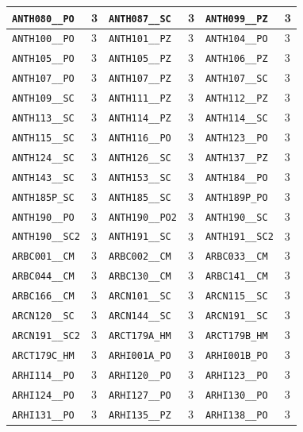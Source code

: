 \begin{longtable}{|l|l||l|l||l|l|}
    \verb|ANTH080__PO| & 3 & \verb|ANTH087__SC| & 3 & \verb|ANTH099__PZ| & 3\\\hline
    \verb|ANTH100__PO| & 3 & \verb|ANTH101__PZ| & 3 & \verb|ANTH104__PO| & 3\\\hline
    \verb|ANTH105__PO| & 3 & \verb|ANTH105__PZ| & 3 & \verb|ANTH106__PZ| & 3\\\hline
    \verb|ANTH107__PO| & 3 & \verb|ANTH107__PZ| & 3 & \verb|ANTH107__SC| & 3\\\hline
    \verb|ANTH109__SC| & 3 & \verb|ANTH111__PZ| & 3 & \verb|ANTH112__PZ| & 3\\\hline
    \verb|ANTH113__SC| & 3 & \verb|ANTH114__PZ| & 3 & \verb|ANTH114__SC| & 3\\\hline
    \verb|ANTH115__SC| & 3 & \verb|ANTH116__PO| & 3 & \verb|ANTH123__PO| & 3\\\hline
    \verb|ANTH124__SC| & 3 & \verb|ANTH126__SC| & 3 & \verb|ANTH137__PZ| & 3\\\hline
    \verb|ANTH143__SC| & 3 & \verb|ANTH153__SC| & 3 & \verb|ANTH184__PO| & 3\\\hline
    \verb|ANTH185P_SC| & 3 & \verb|ANTH185__SC| & 3 & \verb|ANTH189P_PO| & 3\\\hline
    \verb|ANTH190__PO| & 3 & \verb|ANTH190__PO2| & 3 & \verb|ANTH190__SC| & 3\\\hline
    \verb|ANTH190__SC2| & 3 & \verb|ANTH191__SC| & 3 & \verb|ANTH191__SC2| & 3\\\hline
    \verb|ARBC001__CM| & 3 & \verb|ARBC002__CM| & 3 & \verb|ARBC033__CM| & 3\\\hline
    \verb|ARBC044__CM| & 3 & \verb|ARBC130__CM| & 3 & \verb|ARBC141__CM| & 3\\\hline
    \verb|ARBC166__CM| & 3 & \verb|ARCN101__SC| & 3 & \verb|ARCN115__SC| & 3\\\hline
    \verb|ARCN120__SC| & 3 & \verb|ARCN144__SC| & 3 & \verb|ARCN191__SC| & 3\\\hline
    \verb|ARCN191__SC2| & 3 & \verb|ARCT179A_HM| & 3 & \verb|ARCT179B_HM| & 3\\\hline
    \verb|ARCT179C_HM| & 3 & \verb|ARHI001A_PO| & 3 & \verb|ARHI001B_PO| & 3\\\hline
    \verb|ARHI114__PO| & 3 & \verb|ARHI120__PO| & 3 & \verb|ARHI123__PO| & 3\\\hline
    \verb|ARHI124__PO| & 3 & \verb|ARHI127__PO| & 3 & \verb|ARHI130__PO| & 3\\\hline
    \verb|ARHI131__PO| & 3 & \verb|ARHI135__PZ| & 3 & \verb|ARHI138__PO| & 3\\\hline

\end{longtable}
